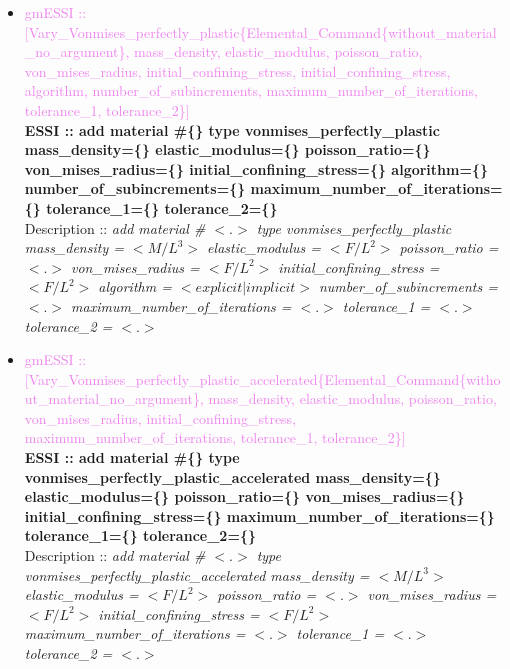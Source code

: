 \documentclass[11pt]{article}
\begin{document}
\begin{itemize}
    \item \textcolor{violet}{gmESSI :: [Vary\_Vonmises\_perfectly\_plastic\{Elemental\_Command\{without\_material\_no\_argument\}, mass\_density, elastic\_modulus, poisson\_ratio, von\_mises\_radius, initial\_confining\_stress, initial\_confining\_stress, algorithm, number\_of\_subincrements, maximum\_number\_of\_iterations, tolerance\_1, tolerance\_2\}]}\\
    \textbf{ESSI :: add material \#\{\} type vonmises\_perfectly\_plastic mass\_density=\{\} elastic\_modulus=\{\} poisson\_ratio=\{\}  von\_mises\_radius=\{\} initial\_confining\_stress=\{\} algorithm=\{\} number\_of\_subincrements=\{\} maximum\_number\_of\_iterations=\{\} tolerance\_1=\{\} tolerance\_2=\{\} } \\
    Description ::  \textit{ add material \# $<.>$ type vonmises\_perfectly\_plastic mass\_density = $<M/L^3>$ elastic\_modulus = $<F/L^2>$ poisson\_ratio = $<.>$ von\_mises\_radius = $<F/L^2>$ initial\_confining\_stress = $<F/L^2>$ algorithm = $<explicit|implicit>$ number\_of\_subincrements = $<.>$ maximum\_number\_of\_iterations = $<.>$ tolerance\_1 = $<.>$ tolerance\_2 = $<.>$} 

    \item \textcolor{violet}{gmESSI :: [Vary\_Vonmises\_perfectly\_plastic\_accelerated\{Elemental\_Command\{without\_material\_no\_argument\}, mass\_density, elastic\_modulus, poisson\_ratio, von\_mises\_radius, initial\_confining\_stress, maximum\_number\_of\_iterations, tolerance\_1, tolerance\_2\}]}\\
    \textbf{ESSI :: add material \#\{\} type vonmises\_perfectly\_plastic\_accelerated mass\_density=\{\} elastic\_modulus=\{\} poisson\_ratio=\{\} von\_mises\_radius=\{\} initial\_confining\_stress=\{\}  maximum\_number\_of\_iterations=\{\}  tolerance\_1=\{\}  tolerance\_2=\{\}}\\
    Description ::  \textit{ add material \# $<.>$ type vonmises\_perfectly\_plastic\_accelerated mass\_density = $<M/L^3>$ elastic\_modulus = $<F/L^2>$ poisson\_ratio = $<.>$ von\_mises\_radius = $<F/L^2>$ initial\_confining\_stress = $<F/L^2>$  maximum\_number\_of\_iterations = $<.>$ tolerance\_1 = $<.>$ tolerance\_2 = $<.>$} 


\end{itemize}
\end{document}
